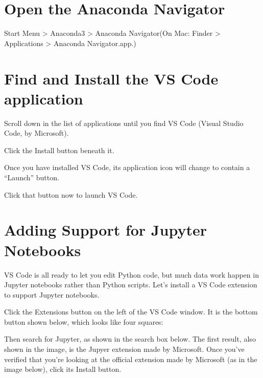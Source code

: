 \documentclass[letterpaper,10pt,english]{jupyterBook}
\begin{document}
\section{Open the Anaconda Navigator}
\label{\detokenize{vs-code-installation:open-the-anaconda-navigator}}
\sphinxAtStartPar
Start Menu > Anaconda3 > Anaconda Navigator(On Mac: Finder > Applications > Anaconda Navigator.app.)

\sphinxAtStartPar



\section{Find and Install the VS Code application}
\label{\detokenize{vs-code-installation:find-and-install-the-vs-code-application}}
\sphinxAtStartPar
Scroll down in the list of applications until you find VS Code (Visual
Studio Code, by Microsoft).

\sphinxAtStartPar


\sphinxAtStartPar
Click the Install button beneath it.

\sphinxAtStartPar
Once you have installed VS Code, its application icon will change to
contain a “Launch” button.

\sphinxAtStartPar


\sphinxAtStartPar
Click that button now to launch VS Code.


\section{Adding Support for Jupyter Notebooks}
\label{\detokenize{vs-code-installation:adding-support-for-jupyter-notebooks}}
\sphinxAtStartPar
VS Code is all ready to let you edit Python code, but much data work happen in
Jupyter notebooks rather than Python scripts.  Let’s install a VS Code extension
to support Jupyter notebooks.

\sphinxAtStartPar
Click the Extensions button on the left of the VS Code window.  It is the bottom button shown below, which looks like four squares:

\sphinxAtStartPar


\sphinxAtStartPar
Then search for Jupyter, as shown in the search box below.  The first result,
also shown in the image, is the Jupyer extension made by Microsoft.  Once you’ve
verified that you’re looking at the official extension made by Microsoft (as in
the image below), click its Install button.

\sphinxAtStartPar
\end{document}
